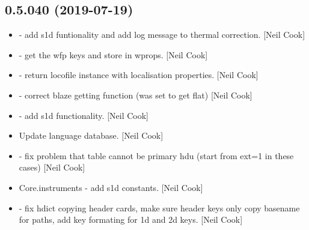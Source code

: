 \documentclass[a4paper,10pt,english]{report}
\begin{document}
\subsection{0.5.040 (2019-07-19)}
\label{\detokenize{misc/changelog:id102}}\begin{itemize}
\item {} 
 - add s1d funtionality and add log message
to thermal correction. {[}Neil Cook{]}

\item {} 
 - get the wfp keys and store in wprops. {[}Neil
Cook{]}

\item {} 
 - return locofile instance with
localisation properties. {[}Neil Cook{]}

\item {} 
 - correct blaze getting function (was set
to get flat) {[}Neil Cook{]}

\item {} 
 - add s1d functionality. {[}Neil Cook{]}

\item {} 
Update language database. {[}Neil Cook{]}

\item {} 
 - fix problem that table cannot be primary hdu (start from
ext=1 in these cases) {[}Neil Cook{]}

\item {} 
Core.instruments - add s1d constants. {[}Neil Cook{]}

\item {} 
 - fix hdict copying header cards, make sure header keys
only copy basename for paths, add key formating for 1d and 2d keys.
{[}Neil Cook{]}

\end{itemize}
\end{document}
